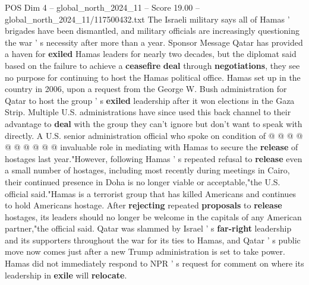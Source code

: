 \begin{textsample}{POS Dim 4 – global\_north\_2024\_11 – Score 19.00 – global\_north\_2024\_11/117500432.txt}
The Israeli military says all of Hamas ' brigades have been dismantled, and military officials are increasingly questioning the war ' s necessity after more than a year.
Sponsor Message Qatar has provided a haven for \textbf{exiled} Hamas leaders for nearly two decades, but the diplomat said based on the failure to achieve a \textbf{ceasefire} \textbf{deal} through \textbf{negotiations}, they see no purpose for continuing to host the Hamas political office.
Hamas set up in the country in 2006, upon a request from the George W.
Bush administration for Qatar to host the group ' s \textbf{exiled} leadership after it won elections in the Gaza Strip.
Multiple U.S. administrations have since used this back channel to their advantage to \textbf{deal} with the group they can't ignore but don't want to speak with directly.
A U.S. senior administration official who spoke on condition of @ @ @ @ @ @ @ @ @ @ invaluable role in mediating with Hamas to secure the \textbf{release} of hostages last year."However, following Hamas ' s repeated refusal to \textbf{release} even a small number of hostages, including most recently during meetings in Cairo, their continued presence in Doha is no longer viable or acceptable,"the U.S. official said."Hamas is a terrorist group that has killed Americans and continues to hold Americans hostage.
After \textbf{rejecting} repeated \textbf{proposals} to \textbf{release} hostages, its leaders should no longer be welcome in the capitals of any American partner,"the official said.
Qatar was slammed by Israel ' s \textbf{far-right} leadership and its supporters throughout the war for its ties to Hamas, and Qatar ' s public move now comes just after a new Trump administration is set to take power.
Hamas did not immediately respond to NPR ' s request for comment on where its leadership in \textbf{exile} will \textbf{relocate}.

\end{textsample}
